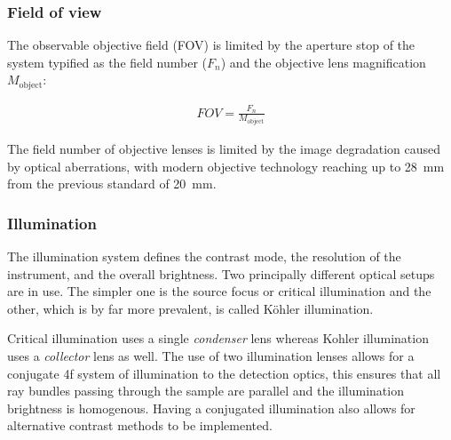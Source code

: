 




\subsubsection{Field of view}

The observable objective field (FOV) is limited by the aperture stop of the system typified as the field number ($F_n $) and the objective lens magnification $M_{\text{object}}$:

\begin{align}
FOV = \frac{F_{n}}{M_{\text{object}}}
\end{align}

The field number of objective lenses is limited by the image degradation caused by optical aberrations, with modern objective technology reaching up to \SI{28}{\milli\meter} from the previous standard of \SI{20}{\milli\meter}.

\subsubsection{Illumination}

The illumination system defines the contrast mode, the resolution of the instrument, and the overall brightness.
Two principally different optical setups are in use.
The simpler one is the source focus or critical illumination and the other, which is by far more prevalent, is called Köhler illumination.

Critical illumination uses a single \emph{condenser} lens whereas Kohler illumination uses a \emph{collector} lens as well.
The use of two illumination lenses allows for a conjugate 4f system of illumination to the detection optics, this ensures that all ray bundles passing through the sample are parallel and the illumination brightness is homogenous.
Having a conjugated illumination also allows for alternative contrast methods to be implemented. %

